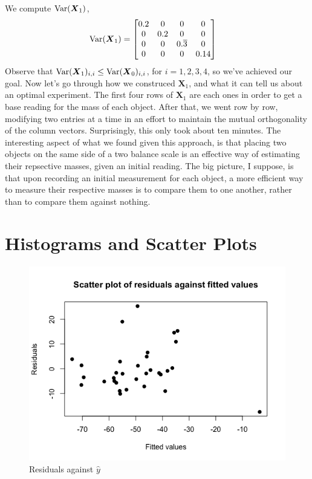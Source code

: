 \documentclass{amsart}
\newcommand{\var}{{\rm Var}}
\newcommand{\bvec}[1]{{\boldsymbol #1}}
\begin{document}
			We compute $\var(\bvec{X}_{1})$,
				\begin{align*}
					\var(\bvec{X}_{1}) &= \begin{bmatrix}
						0.2 & 0 & 0 & 0 \\
						0 & 0.2 & 0 & 0 \\
						0 & 0 & 0.\overline{3} & 0 \\
						0 & 0 & 0 & 0.14
					\end{bmatrix}
				\end{align*}
			Observe that $\var(\bvec{X}_{1})_{i,i} \leq \var(\bvec{X}_{0})_{i,i}$, for $i = 1,2,3,4$, so we've achieved our goal.
			Now let's go through how we construced $\bvec{X}_{1}$, and what it can tell us about an optimal experiment.
			The first four rows of $\bvec{X}_{1}$ are each ones in order to get a base reading for the mass of each object.
			After that, we went row by row, modifying two entries at a time in an effort to maintain the mutual orthogonality of the column vectors.
			Surprisingly, this only took about ten minutes.
			The interesting aspect of what we found given this approach, is that placing two objects on the same side of a two balance scale is an effective way of estimating their repsective masses, given an initial reading.
			The big picture, I suppose, is that upon recording an initial measurement for each object, a more efficient way to measure their respective masses is to compare them to one another, rather than to compare them against nothing.

	\section{Histograms and Scatter Plots} %
	\label{sec:figures}
		\begin{figure}[h]
			\includegraphics[width=0.75\linewidth]{scatterplot1}
			\caption{Residuals against $\hat{y}$}
			\label{scatterplot1}
		\end{figure}
\end{document}
